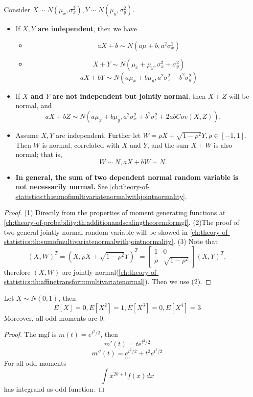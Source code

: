 \begin{refsection}
\begin{lemma}\label{ch:theory-of-statistics:th:basicnormalproperties}
Consider $X\sim N(\mu_x,\sigma^2_x), Y\sim N(\mu_y,\sigma^2_y)$.
\begin{itemize}
	\item  If \textbf{$X,Y$ are independent}, then we have
	\begin{itemize}
		\item $$aX + b \sim N(a\mu + b, a^2\sigma_x^2)$$
		\item  $$X+Y \sim N(\mu_x+\mu_y,\sigma_x^2 + \sigma_y^2)$$
		$$aX+bY \sim N(a\mu_x+b\mu_y,a^2\sigma_x^2 + b^2 \sigma_y^2)$$
	\end{itemize}
	\item  If \textbf{$X$ and $Y$ are not independent but jointly normal}, then $X+Z$ will be normal, and
	$$aX + bZ \sim N(a\mu_x+b\mu_y,a^2\sigma_x^2 + b^2\sigma_z^2 + 2abCov(X,Z)).$$
	\item  Assume $X, Y$ are independent. Further let $W = \rho X + \sqrt{1-\rho^2}Y, \rho\in [-1,1]$. Then
	 $W$ is normal, correlated with $X$ and $Y$, and the sum $X+W$ is also normal; that is, 
	 $$W\sim N, aX+bW\sim N.$$
	 \item \textbf{In general, the sum of two dependent normal random variable is not necessarily normal.} See \autoref{ch:theory-of-statistics:th:sumofmultivariatenormalwithjointnormality}.
\end{itemize}
\end{lemma}
\begin{proof}
(1) Directly from the properties of moment generating functions at \autoref{ch:theory-of-probability:th:additionandscalingtheoremformgf}.
(2)The proof of two general jointly normal random variable will be showed in \autoref{ch:theory-of-statistics:th:sumofmultivariatenormalwithjointnormality}.
(3) Note that 
$$(X,W)^T = (X,\rho X + \sqrt{1-\rho^2}Y)^T = \begin{bmatrix}
1 & 0\\
\rho & \sqrt{1-\rho^2}
\end{bmatrix} (X,Y)^T,$$
therefore $(X,W)$ are jointly normal(\autoref{ch:theory-of-statistics:th:affinetransformmultivariatenormal}). Then we use (2).
\end{proof}


\begin{lemma}\label{ch:theory-of-statistics:th:MomentsOfStandardNormalDistribution}
Let $X\sim N(0,1)$, then
$$E[X] = 0, E[X^2]=1, E[X^3] = 0, E[X^4] = 3$$
Moreover, all odd moments are 0.
\end{lemma}
\begin{proof}
The mgf is $m(t)=e^{t^2/2}$, then
$$m'(t) = te^{t^2/2}$$
$$m''(t) = e^{t^2/2} + t^2e^{t^2/2}$$
$$\dots$$
For all odd moments
$$\int x^{2k+1}f(x)dx$$
has integrand as odd function. 
\end{proof}


\end{refsection}
